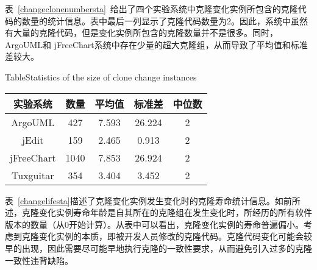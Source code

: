 表~\ref{changeclonenumbersta}~给出了四个实验系统中克隆变化实例所包含的克隆代码的数量的统计信息。表中最后一列显示了克隆代码数量为2。因此，系统中虽然有大量的克隆代码，但是变化实例所包含的克隆数量并不是很多。同时，ArgoUML和 jFreeChart系统中存在少量的超大克隆组，从而导致了平均值和标准差较大。

\begin{table}[htbp]
{Table$\!$}{Statistics of the size of clone change instances}
\vspace{0.5em}
\centering
\wuhao
\begin{tabular}{ccccc}
\toprule[1.5pt]
{实验系统}&{数量}&{平均值}&{标准差}&{中位数}\\ 
\midrule[1pt]
ArgoUML&427&7.593&	26.224&2\\
jEdit&159&	2.465&	0.913&2\\ 
jFreeChart&1040&	7.853&	26.924&2\\
Tuxguitar&354&	3.404	&3.452&2\\ 
\bottomrule[1.5pt]
\end{tabular}
\end{table}


表~\ref{changelifesta}描述了克隆变化实例发生变化时的克隆寿命统计信息。如前所述，克隆变化实例寿命年龄是自其所在的克隆组在发生变化时，所经历的所有软件版本的数量（从$0$开始计算）。从表中可以看出，克隆变化实例的寿命普遍偏小。考虑到克隆变化实例的本质，即被开发人员修改的克隆代码。克隆代码变化可能会较早的出现，因此需要尽可能早地执行克隆的一致性要求，从而避免引入过多的克隆一致性违背缺陷。

